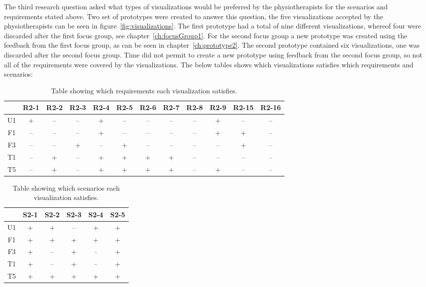 The third research question asked what types of visualizations would be preferred by the physiotherapists for the scenarios and requirements stated above. Two set of prototypes were created to answer this question, the five visualizations accepted by the physiotherapists can be seen in figure~\ref{fig:visualizations}. The first prototype had a total of nine different visualizations, whereof four were discarded after the first focus group, see chapter~\ref{ch:focusGroup1}. For the second focus group a new prototype was created using the feedback from the first focus group, as can be seen in chapter~\ref{ch:prototype2}. The second prototype contained six visualizations, one was discarded after the second focus group. Time did not permit to create a new prototype using feedback from the second focus group, so not all of the requirements were covered by the visualizations. The below tables shows which visualizations satisfies which requirements and scenarios:

\begin{table}[h!]
  \centering
  \begin{tabular}{|c|c|c|c|c|c|c|c|c|c|c|c|}
    \hline
    & R2-1 & R2-2 & R2-3 & R2-4 & R2-5 & R2-6 & R2-7 & R2-8 & R2-9 & R2-15 & R2-16 \\ \hline
    U1 & + & -- & -- & + & -- & -- & -- & -- & + & -- & -- \\ \hline
    F1 & -- & -- & -- & + & -- & -- & -- & -- & + & + & -- \\ \hline
    F3 & -- & -- & + & -- & + & -- & -- & -- & -- & + & -- \\ \hline
    T1 & -- & + & -- & + & + & + & + & -- & -- & -- & -- \\ \hline
    T5 & -- & + & -- & + & + & + & + & -- & + & -- & -- \\ \hline
  \end{tabular}
  \caption{Table showing which requirements each visualization satisfies.}
\end{table} 

\begin{table}[h!]
  \centering
  \begin{tabular}{|c|c|c|c|c|c|}
    \hline
       & S2-1 & S2-2 & S2-3 & S2-4 & S2-5 \\ \hline
    U1 & +  & +  & -- & +  & +  \\ \hline
    F1 & +  & +  & +  & +  & +  \\ \hline
    F3 & +  & -- & +  & -- & +  \\ \hline
    T1 & +  & -- & +  & -- & +  \\ \hline
    T5 & +  & +  & +  & +  & +  \\ \hline
  \end{tabular}
  \caption{Table showing which scenarios each visualization satisfies.}
\end{table}

